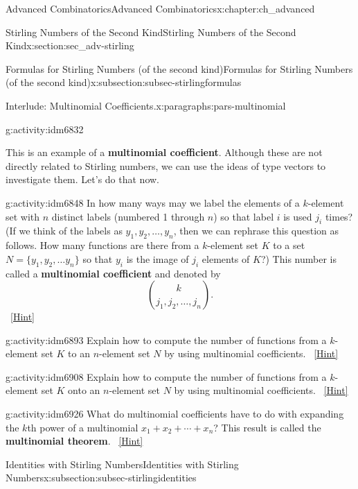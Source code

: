 \documentclass[oneside,10pt,]{book}
\newcommand{\terminology}[1]{\textbf{#1}}
\numberwithin{equation}{chapter}
\begin{document}
\begin{chapterptx}{Advanced Combinatorics}{}{Advanced Combinatorics}{}{}{x:chapter:ch_advanced}
\begin{sectionptx}{Stirling Numbers of the Second Kind}{}{Stirling Numbers of the Second Kind}{}{}{x:section:sec_adv-stirling}
\begin{subsectionptx}{Formulas for Stirling Numbers (of the second kind)}{}{Formulas for Stirling Numbers (of the second kind)}{}{}{x:subsection:subsec-stirlingformulas}
\begin{paragraphs}{Interlude: Multinomial Coefficients.}{x:paragraphs:pars-multinomial}
\begin{activity}{}{g:activity:idm6832}
\end{activity}
This is an example of a \terminology{multinomial coefficient}.  Although these are not directly related to Stirling numbers, we can use the ideas of type vectors to investigate them.  Let's do that now.%
\begin{activity}{}{g:activity:idm6848}%
In how many ways may we label the elements of a \(k\)-element set with \(n\) distinct labels (numbered 1 through \(n\)) so that label \(i\) is used \(j_i\) times? (If we think of the labels as \(y_1, y_2, \ldots, y_n\), then we can rephrase this question as follows.  How many functions are there from a \(k\)-element set \(K\) to a set \(N=\{y_1,y_2,\ldots y_n\}\) so that \(y_i\) is the image of \(j_i\) elements of \(K\)?) This number is called a \terminology{multinomial coefficient} and denoted by%
\begin{equation*}
\binom{k}{j_1,j_2,\ldots, j_n}.
\end{equation*}
%
\qquad~\hfill{\tiny\hyperlink{g:hint:idm6870-back}{[Hint]}}\end{activity}
\begin{activity}{}{g:activity:idm6893}%
Explain how to compute the number of functions from a \(k\)-element set \(K\) to an \(n\)-element set \(N\) by using multinomial coefficients.%
\qquad~\hfill{\tiny\hyperlink{g:hint:idm6900-back}{[Hint]}}\end{activity}
\begin{activity}{}{g:activity:idm6908}%
Explain how to compute the number of functions from a \(k\)-element set \(K\) onto an \(n\)-element set \(N\) by using multinomial coefficients.%
\qquad~\hfill{\tiny\hyperlink{g:hint:idm6915-back}{[Hint]}}\end{activity}
\begin{activity}{}{g:activity:idm6926}%
What do multinomial coefficients have to do with expanding the \(k\)th power of a multinomial \(x_1+x_2+\cdots+x_n\)? This result is called the \terminology{multinomial theorem}.%
\qquad~\hfill{\tiny\hyperlink{g:hint:idm6932-back}{[Hint]}}\end{activity}
\end{paragraphs}%
\end{subsectionptx}
%
%
\typeout{************************************************}
\typeout{************************************************}
%
\begin{subsectionptx}{Identities with Stirling Numbers}{}{Identities with Stirling Numbers}{}{}{x:subsection:subsec-stirlingidentities}

\end{subsectionptx}
\end{sectionptx}
\end{chapterptx}
\end{document}
